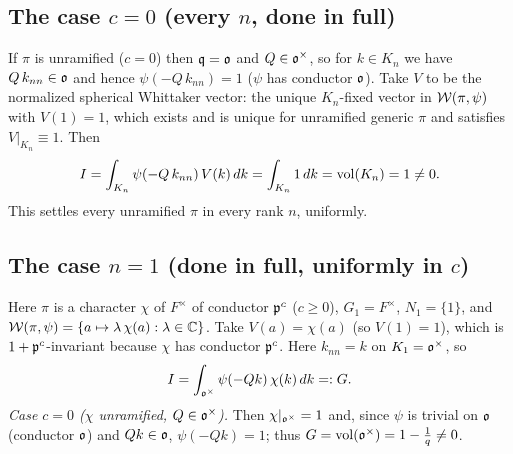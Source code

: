 \subsection*{The case $c=0$ \textup{(}every $n$, done in full\textup{)}}
If $\pi$ is unramified \textup{(}$c=0$\textup{)} then $\mathfrak{q}=\mathfrak{o}$ and $Q\in\mathfrak{o}^\times$,
so for $k\in K_n$ we have $Q\,k_{nn}\in\mathfrak{o}$ and hence $\psi(-Q\,k_{nn})=1$ \textup{(}$\psi$ has
conductor $\mathfrak{o}$\textup{)}. Take $V$ to be the normalized spherical Whittaker vector: the unique
$K_n$-fixed vector in $\mathcal{W}(\pi,\psi)$ with $V(1)=1$, which exists and is unique for unramified
generic $\pi$ and satisfies $V|_{K_n}\equiv1$. Then
\[
I=\int_{K_n}\psi(-Q\,k_{nn})\,V(k)\,dk=\int_{K_n}1\,dk=\operatorname{vol}(K_n)=1\neq0 .
\]
This settles every unramified $\pi$ in every rank $n$, uniformly.

\subsection*{The case $n=1$ \textup{(}done in full, uniformly in $c$\textup{)}}
Here $\pi$ is a character $\chi$ of $F^\times$ of conductor $\mathfrak{p}^{c}$ \textup{(}$c\ge0$\textup{)},
$G_1=F^\times$, $N_1=\{1\}$, and $\mathcal{W}(\pi,\psi)=\{a\mapsto \lambda\,\chi(a):\lambda\in\mathbb{C}\}$.
Take $V(a)=\chi(a)$ \textup{(}so $V(1)=1$\textup{)}, which is $1+\mathfrak{p}^{c}$-invariant because
$\chi$ has conductor $\mathfrak{p}^{c}$. Here $k_{nn}=k$ on $K_1=\mathfrak{o}^\times$, so
\[
I=\int_{\mathfrak{o}^\times}\psi(-Q k)\,\chi(k)\,dk=:G .
\]
\emph{Case $c=0$ \textup{(}$\chi$ unramified, $Q\in\mathfrak{o}^\times$\textup{)}.} Then
$\chi|_{\mathfrak{o}^\times}=1$ and, since $\psi$ is trivial on $\mathfrak{o}$ \textup{(}conductor
$\mathfrak{o}$\textup{)} and $Qk\in\mathfrak{o}$, $\psi(-Qk)=1$; thus
$G=\operatorname{vol}(\mathfrak{o}^\times)=1-\tfrac1q\neq0$.

